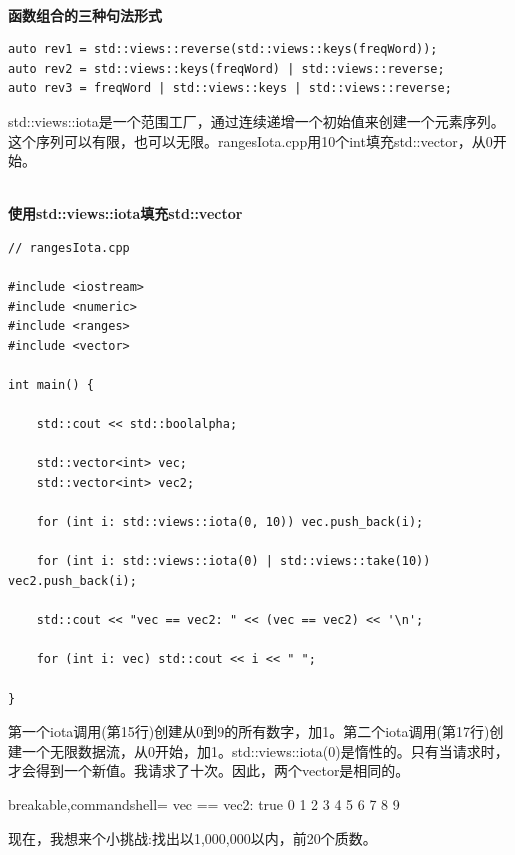 \hspace*{\fill} \\ %
\noindent
\textbf{函数组合的三种句法形式}
\begin{lstlisting}[style=styleCXX]
auto rev1 = std::views::reverse(std::views::keys(freqWord));
auto rev2 = std::views::keys(freqWord) | std::views::reverse;
auto rev3 = freqWord | std::views::keys | std::views::reverse;
\end{lstlisting}


std::views::iota是一个范围工厂，通过连续递增一个初始值来创建一个元素序列。这个序列可以有限，也可以无限。rangesIota.cpp用10个int填充std::vector，从0开始。

\hspace*{\fill} \\ %
\noindent
\textbf{使用std::views::iota填充std::vector}
\begin{lstlisting}[style=styleCXX]
// rangesIota.cpp

#include <iostream>
#include <numeric>
#include <ranges>
#include <vector>

int main() {
	
	std::cout << std::boolalpha;
	
	std::vector<int> vec;
	std::vector<int> vec2;
	
	for (int i: std::views::iota(0, 10)) vec.push_back(i);
	
	for (int i: std::views::iota(0) | std::views::take(10)) vec2.push_back(i);
	
	std::cout << "vec == vec2: " << (vec == vec2) << '\n';
	
	for (int i: vec) std::cout << i << " ";

}
\end{lstlisting}

第一个iota调用(第15行)创建从0到9的所有数字，加1。第二个iota调用(第17行)创建一个无限数据流，从0开始，加1。std::views::iota(0)是惰性的。只有当请求时，才会得到一个新值。我请求了十次。因此，两个vector是相同的。

\begin{tcblisting}{breakable,commandshell={}}
vec == vec2: true
0 1 2 3 4 5 6 7 8 9
\end{tcblisting}

现在，我想来个小挑战:找出以1,000,000以内，前20个质数。

